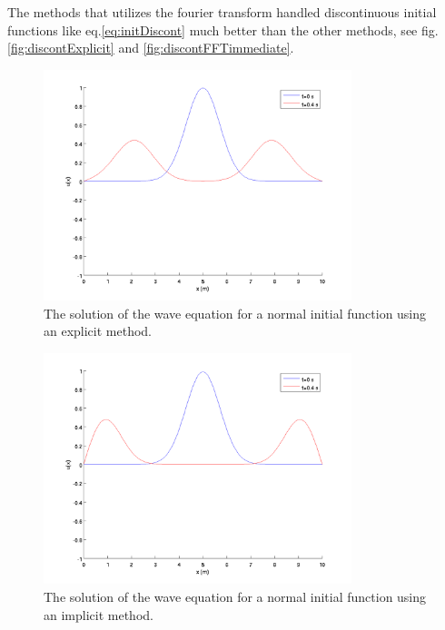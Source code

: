 The methods that utilizes the fourier transform handled discontinuous initial functions like eq.\eqref{eq:initDiscont} much better than the other methods, see fig. \ref{fig:discontExplicit} and \ref{fig:discontFFTimmediate}.

\begin{figure}[htbp]
	\centering
	\includegraphics[width=0.8\textwidth]{img/normalImplicit}
	\caption{The solution of the wave equation for a normal initial function using an explicit method.}
	\label{fig:normalImplicit}
\end{figure}

\begin{figure}[htbp]
	\centering
	\includegraphics[width=0.8\textwidth]{img/normalExplicit}
	\caption{The solution of the wave equation for a normal initial function using an implicit method.}
	\label{fig:normalExplicit}
\end{figure}

